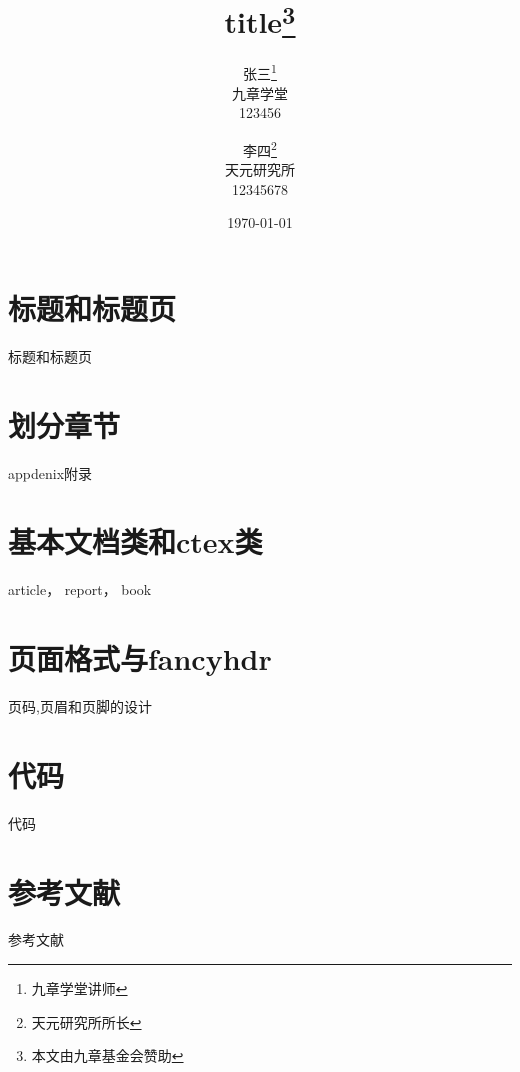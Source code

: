 \documentclass[a4paper, titlepage]{ctexart}
\title{title\thanks{本文由九章基金会赞助}}
\author{
	张三\thanks{九章学堂讲师}\\九章学堂\\123456\and
	李四\thanks{天元研究所所长}\\天元研究所\\12345678
}
\date{\today}
\begin{document}
\maketitle
\tableofcontents


\section{标题和标题页}

\centering 标题和标题页

\section{划分章节}

appdenix附录

\section{基本文档类和ctex类}


article， report， book 

\section{页面格式与fancyhdr}
页码,页眉和页脚的设计


\appendix %
\section{代码}
代码
\section{参考文献}
参考文献
\end{document}

